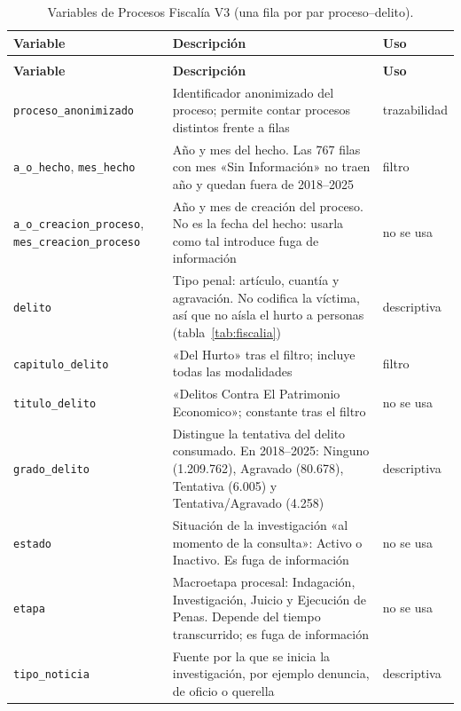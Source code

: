 {\begin{longtable}{@{}>{\raggedright\arraybackslash}p{4.2cm}>{\raggedright\arraybackslash}p{8.6cm}>{\raggedright\arraybackslash}p{2.2cm}@{}}
\caption{Variables de Procesos Fiscalía V3 (una fila por par proceso--delito).}\label{tab:dic-fiscalia}\\
\toprule
\textbf{Variable} & \textbf{Descripción} & \textbf{Uso} \\
\midrule
\endfirsthead
\multicolumn{3}{@{}l}{\emph{Tabla~\ref{tab:dic-fiscalia} (continuación)}}\\
\toprule
\textbf{Variable} & \textbf{Descripción} & \textbf{Uso} \\
\midrule
\endhead
\texttt{proceso\_\allowbreak{}anonimizado} & Identificador anonimizado del proceso; permite contar procesos distintos frente a filas & trazabilidad \\
\texttt{a\_\allowbreak{}o\_\allowbreak{}hecho}, \texttt{mes\_\allowbreak{}hecho} & Año y mes del hecho. Las 767 filas con mes «Sin Información» no traen año y quedan fuera de 2018--2025 & filtro \\
\texttt{a\_\allowbreak{}o\_\allowbreak{}creacion\_\allowbreak{}proceso}, \texttt{mes\_\allowbreak{}creacion\_\allowbreak{}proceso} & Año y mes de creación del proceso. No es la fecha del hecho: usarla como tal introduce fuga de información & no se usa \\
\texttt{delito} & Tipo penal: artículo, cuantía y agravación. No codifica la víctima, así que no aísla el hurto a personas (tabla~\ref{tab:fiscalia}) & descriptiva \\
\texttt{capitulo\_\allowbreak{}delito} & «Del Hurto» tras el filtro; incluye todas las modalidades & filtro \\
\texttt{titulo\_\allowbreak{}delito} & «Delitos Contra El Patrimonio Economico»; constante tras el filtro & no se usa \\
\texttt{grado\_\allowbreak{}delito} & Distingue la tentativa del delito consumado. En 2018--2025: Ninguno (1.209.762), Agravado (80.678), Tentativa (6.005) y Tentativa/Agravado (4.258) & descriptiva \\
\texttt{estado} & Situación de la investigación «al momento de la consulta»: Activo o Inactivo. Es fuga de información & no se usa \\
\texttt{etapa} & Macroetapa procesal: Indagación, Investigación, Juicio y Ejecución de Penas. Depende del tiempo transcurrido; es fuga de información & no se usa \\
\texttt{tipo\_\allowbreak{}noticia} & Fuente por la que se inicia la investigación, por ejemplo denuncia, de oficio o querella & descriptiva \\

\end{longtable}}
